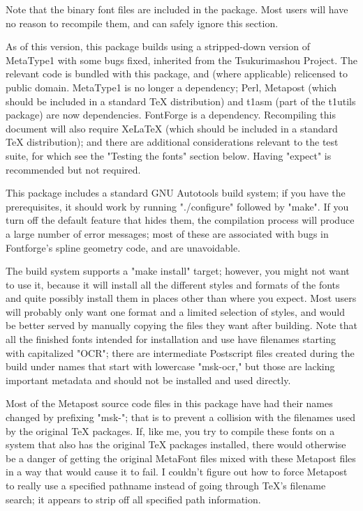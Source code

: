 \documentclass{article}
\begin{document}
Note that the binary font files are included in the package.  Most users
will have no reason to recompile them, and can safely ignore this section.

As of this version, this package builds using a stripped-down version of
MetaType1 with some bugs fixed, inherited from the Tsukurimashou Project. 
The relevant code is bundled with this package, and (where applicable)
relicensed to public domain.  MetaType1 is no longer a dependency; Perl,
Metapost (which should be included in a standard TeX distribution) and t1asm
(part of the t1utils package) are now dependencies.  FontForge is a
dependency.  Recompiling this document will also require XeLaTeX (which
should be included in a standard TeX distribution); and there are additional
considerations relevant to the test suite, for which see the "Testing the
fonts" section below.  Having "expect" is recommended but not required.

This package includes a standard GNU Autotools build system; if you have the
prerequisites, it should work by running "./configure" followed by "make". 
If you turn off the default feature that hides them, the compilation process
will produce a large number of error messages; most of these are associated
with bugs in Fontforge's spline geometry code, and are unavoidable.

The build system supports a "make install" target; however, you might not
want to use it, because it will install all the different styles and
formats of the fonts and quite possibly install them in places other than
where you expect.  Most users will probably only want one format and a
limited selection of styles, and would be better served by manually copying
the files they want after building.  Note that all the finished fonts
intended for installation and use have filenames starting with capitalized
"OCR"; there are intermediate Postscript files created during the build
under names that start with lowercase "msk-ocr," but those are lacking
important metadata and should not be installed and used directly.

Most of the Metapost source code files in this package
have had their names changed by prefixing "msk-"; that is to prevent a
collision with the filenames used by the original TeX packages.  If, like
me, you try to compile these fonts on a system that also has the original
TeX packages installed, there would otherwise be a danger of getting the
original MetaFont files mixed with these Metapost files in a way that would
cause it to fail.  I couldn't figure out how to force Metapost to really
use a specified pathname instead of going through TeX's filename search; it
appears to strip off all specified path information.
\end{document}
